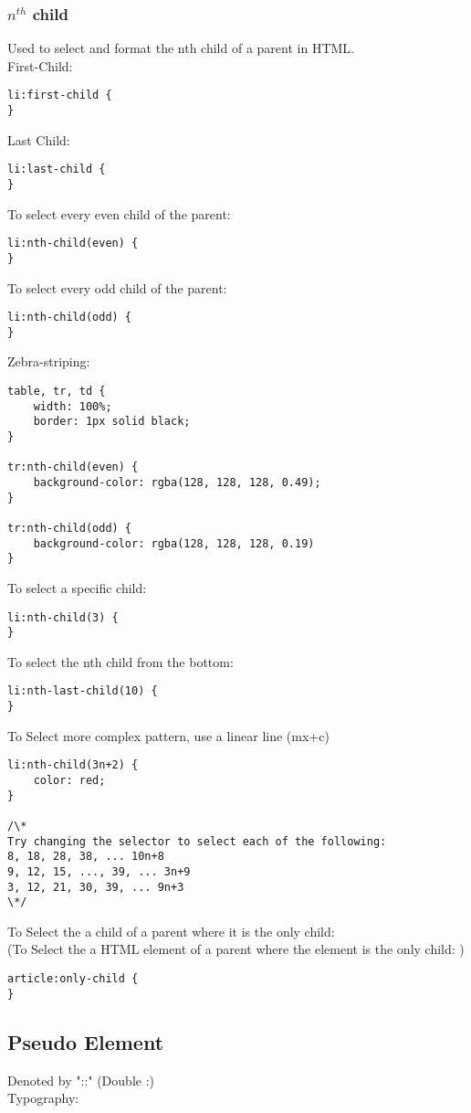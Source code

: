 \documentclass[]{article}
\begin{document}
\subsubsection{$n^{th}$ child}
Used to select and format the nth child of a parent in HTML.
\\
First-Child:
\begin{lstlisting}
li:first-child {
}
\end{lstlisting}
Last Child:
\begin{lstlisting}
li:last-child {
}
\end{lstlisting}
To select every even child of the parent:
\begin{lstlisting}
li:nth-child(even) {
}
\end{lstlisting}
To select every odd child of the parent:
\begin{lstlisting}
li:nth-child(odd) {
}
\end{lstlisting}
Zebra-striping:
\begin{lstlisting}
table, tr, td {
	width: 100%;
	border: 1px solid black;
}

tr:nth-child(even) {
	background-color: rgba(128, 128, 128, 0.49);
}

tr:nth-child(odd) {
	background-color: rgba(128, 128, 128, 0.19)
}
\end{lstlisting}
To select a specific child:
\begin{lstlisting}
li:nth-child(3) {
}
\end{lstlisting}
To select the nth child from the bottom:
\begin{lstlisting}
li:nth-last-child(10) {
}
\end{lstlisting}
To Select more complex pattern, use a linear line (mx+c)
\begin{lstlisting}
li:nth-child(3n+2) {
	color: red;
}

/\*
Try changing the selector to select each of the following:
8, 18, 28, 38, ... 10n+8
9, 12, 15, ..., 39, ... 3n+9
3, 12, 21, 30, 39, ... 9n+3
\*/
\end{lstlisting}
To Select the a child of a parent where it is the only child: 
\\
(To Select the a HTML element of a parent where the element is the only child: )
\begin{lstlisting}
article:only-child {
}
\end{lstlisting}

\subsection{Pseudo Element}
Denoted by "::" (Double :)
\\
Typography:
\end{document}
